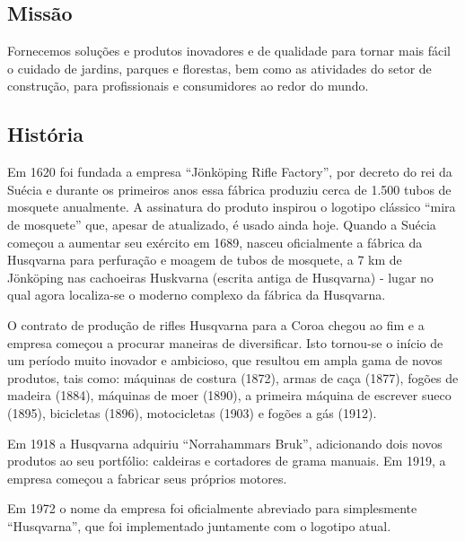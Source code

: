 \documentclass[12pt]{article}
\begin{document}
\subsection{Missão}
	Fornecemos soluções e produtos inovadores e de qualidade para tornar mais fácil o cuidado de jardins, parques e florestas, bem como as atividades do setor de construção, para profissionais e consumidores ao redor do mundo.

	
\subsection{História}
	Em 1620 foi fundada a empresa “Jönköping Rifle Factory”, por decreto do rei da Suécia e durante os primeiros anos essa fábrica produziu cerca de 1.500 tubos de mosquete anualmente. A assinatura do produto inspirou o logotipo clássico “mira de mosquete” que, apesar de atualizado, é usado ainda hoje.
	Quando a Suécia começou a aumentar seu exército em 1689, nasceu oficialmente a fábrica da Husqvarna para perfuração e moagem de tubos de mosquete, a 7 km de Jönköping nas cachoeiras Huskvarna (escrita antiga de Husqvarna) - lugar no qual agora localiza-se o moderno complexo da fábrica da Husqvarna.

	O contrato de produção de rifles Husqvarna para a Coroa chegou ao fim e a empresa começou a procurar maneiras de diversificar. Isto tornou-se o início de um período muito inovador e ambicioso, que resultou em ampla gama de novos produtos, tais como: máquinas de costura (1872), armas de caça (1877), fogões de madeira (1884), máquinas de moer (1890), a primeira máquina de escrever sueco (1895), bicicletas (1896), motocicletas (1903) e fogões a gás (1912).

	Em 1918 a Husqvarna adquiriu “Norrahammars Bruk”, adicionando dois novos produtos ao seu portfólio: caldeiras e cortadores de grama manuais. Em 1919, a empresa começou a fabricar seus próprios motores.

	Em 1972 o nome da empresa foi oficialmente abreviado para simplesmente “Husqvarna”, que foi implementado juntamente com o logotipo atual.

\end{document}
